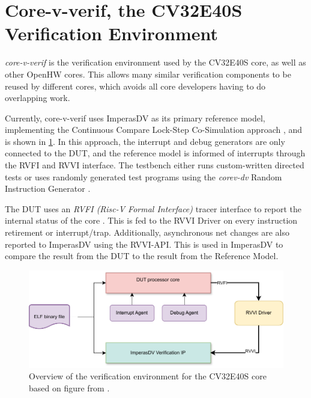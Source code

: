 \section{Core-v-verif, the CV32E40S Verification Environment}
\label{sec:bg_core-v-verif}

\textit{core-v-verif} \cite{openhwgroupOpenhwgroupCorevverif2023} is the verification environment used by the CV32E40S core, as well as other OpenHW cores. This allows many similar verification components to be reused by different cores, which avoids all core developers having to do overlapping work.

Currently, core-v-verif uses ImperasDV as its primary reference model, implementing the Continuous Compare Lock-Step Co-Simulation approach \cite{duncangrahamRISCVVerificationImplications2023}, and is shown in \cref{fig:cv32e40s-overview}. In this approach, the interrupt and debug generators are only connected to the DUT, and the reference model is informed of interrupts through the RVFI and RVVI interface. 
The testbench either runs custom-written directed tests or uses randomly generated test programs using the \textit{corev-dv} Random Instruction Generator
\cite{openhwgroupOpenhwgroupCorevverif2023}.

The DUT uses an \textit{RVFI (Risc-V Formal Interface)} tracer interface to report the internal status of the core \cite{symbioticedaRiscvformalDocsRvfi2020}. This is fed to the RVVI Driver on every instruction retirement or interrupt/trap. Additionally, asynchronous net changes are also reported to ImperasDV using the RVVI-API. This is used in ImperasDV to compare the result from the DUT to the result from the Reference Model. 


\begin{figure}
    \centering
    \includegraphics[width=0.75\linewidth]{figures/core-v-verif.pdf}
    \caption{Overview of the verification environment for the CV32E40S core based on figure from \cite{openhwgroupOpenhwgroupCorevverif2023}.}
    \label{fig:cv32e40s-overview}
\end{figure}



